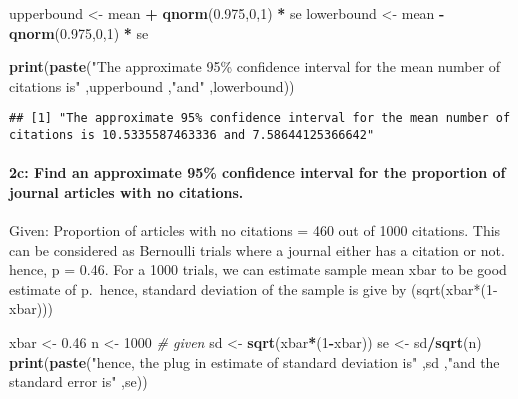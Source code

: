 \documentclass[
]{article}
\newenvironment{Shaded}{\begin{snugshade}}{\end{snugshade}}
\newcommand{\CommentTok}[1]{\textcolor[rgb]{0.56,0.35,0.01}{\textit{#1}}}
\newcommand{\DecValTok}[1]{\textcolor[rgb]{0.00,0.00,0.81}{#1}}
\newcommand{\FloatTok}[1]{\textcolor[rgb]{0.00,0.00,0.81}{#1}}
\newcommand{\FunctionTok}[1]{\textcolor[rgb]{0.13,0.29,0.53}{\textbf{#1}}}
\newcommand{\NormalTok}[1]{#1}
\newcommand{\OtherTok}[1]{\textcolor[rgb]{0.56,0.35,0.01}{#1}}
\newcommand{\SpecialCharTok}[1]{\textcolor[rgb]{0.81,0.36,0.00}{\textbf{#1}}}
\newcommand{\StringTok}[1]{\textcolor[rgb]{0.31,0.60,0.02}{#1}}
\begin{document}
\begin{Shaded}
\begin{Highlighting}[]
\NormalTok{upperbound }\OtherTok{\textless{}{-}}\NormalTok{ mean }\SpecialCharTok{+} \FunctionTok{qnorm}\NormalTok{(}\FloatTok{0.975}\NormalTok{,}\DecValTok{0}\NormalTok{,}\DecValTok{1}\NormalTok{) }\SpecialCharTok{*}\NormalTok{ se}
\NormalTok{lowerbound }\OtherTok{\textless{}{-}}\NormalTok{ mean }\SpecialCharTok{{-}} \FunctionTok{qnorm}\NormalTok{(}\FloatTok{0.975}\NormalTok{,}\DecValTok{0}\NormalTok{,}\DecValTok{1}\NormalTok{) }\SpecialCharTok{*}\NormalTok{ se}

\FunctionTok{print}\NormalTok{(}\FunctionTok{paste}\NormalTok{(}\StringTok{"The approximate 95\% confidence interval for the mean number of citations is"}\NormalTok{ ,upperbound ,}\StringTok{"and"}\NormalTok{ ,lowerbound))}
\end{Highlighting}
\end{Shaded}

\begin{verbatim}
## [1] "The approximate 95% confidence interval for the mean number of citations is 10.5335587463336 and 7.58644125366642"
\end{verbatim}

\hypertarget{c-find-an-approximate-95-confidence-interval-for-the-proportion-of-journal-articles-with-no-citations.}{%
\paragraph{2c: Find an approximate 95\% confidence interval for the
proportion of journal articles with no
citations.}\label{c-find-an-approximate-95-confidence-interval-for-the-proportion-of-journal-articles-with-no-citations.}}

Given: Proportion of articles with no citations = 460 out of 1000
citations. This can be considered as Bernoulli trials where a journal
either has a citation or not. hence, p = 0.46. For a 1000 trials, we can
estimate sample mean xbar to be good estimate of p.~hence, standard
deviation of the sample is give by (sqrt(xbar*(1-xbar)))

\begin{Shaded}
\begin{Highlighting}[]
\NormalTok{xbar }\OtherTok{\textless{}{-}} \FloatTok{0.46}
\NormalTok{n }\OtherTok{\textless{}{-}} \DecValTok{1000}                                     \CommentTok{\# given}
\NormalTok{sd }\OtherTok{\textless{}{-}} \FunctionTok{sqrt}\NormalTok{(xbar}\SpecialCharTok{*}\NormalTok{(}\DecValTok{1}\SpecialCharTok{{-}}\NormalTok{xbar)) }
\NormalTok{se }\OtherTok{\textless{}{-}}\NormalTok{ sd}\SpecialCharTok{/}\FunctionTok{sqrt}\NormalTok{(n)}
\FunctionTok{print}\NormalTok{(}\FunctionTok{paste}\NormalTok{(}\StringTok{"hence, the plug in estimate of standard deviation is"}\NormalTok{ ,sd ,}\StringTok{"and the standard error is"}\NormalTok{ ,se))}
\end{Highlighting}
\end{Shaded}
\end{document}
